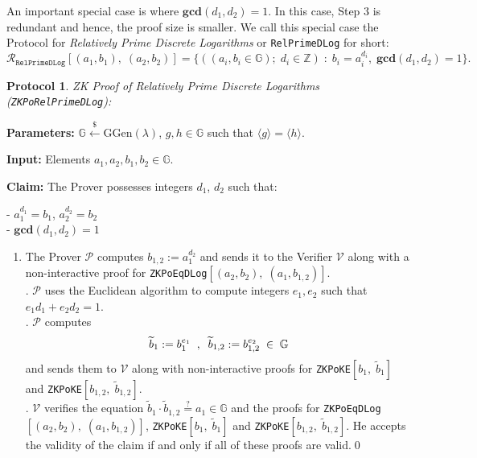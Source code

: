 \documentclass[11pt, lettersize, notitlepage, leqno, footskip=0.6cm]{article}
\newcommand{\bz}{\mathbb Z}
\newcommand{\ttt}{\texttt}
\newcommand{\bG}{\mathbb{G}}
\newcommand{\la}{\langle}
\newcommand{\ra}{\rangle}
\newcommand{\wti}{\widetilde}
\newcommand{\mc}{\mathcal}
\newcommand{\mb}{\mathbb}
\newcommand{\mbf}{\mathbf}
\newcommand{\mr}{\mathrm}
\newcommand{\lamb}{\lambda}
\newcommand{\V}{\mc{V}}
\newcommand{\vs}{\vspace{-0.15cm}}
\newcommand{\noin}{\noindent}
\newcommand{\GCD}{\mbf{gcd}}
\newtheorem{Prot}[Thm]{Protocol}
\numberwithin{equation}{section}
\begin{document}
\noin An important special case is where $\GCD(d_1, d_2) = 1$. In this case, Step 3 is redundant and hence, the proof size is smaller. We call this special case the Protocol for \textit{Relatively Prime Discrete Logarithms} or \verb|RelPrimeDLog| for short:\vs \[\mc{R}_{{\ttt{RelPrimeDLog}}}[(a_1,b_1),\;(a_2,b_2)] = \big\{((a_i, b_i\in\mb{G});\;d_i\in\bz)\;:\; b_i = a_i^{d_i},\;\GCD(d_1,d_2)=1 \big\} .\] 



\begin{Prot} \normalfont \hypertarget{RP}{\textit{ZK Proof of Relatively Prime Discrete Logarithms}} (\verb|ZKPoRelPrimeDLog|):\end{Prot} \vspace{-0.3cm}

\noin \textbf{Parameters:} $\mb{G}\xleftarrow{\$} \mr{GGen}(\lamb)$,  $g,h\in \mb{G}$ such that $\la g \ra = \la h \ra$.

\noin \textbf{Input:} Elements $a_1, a_2, b_1, b_2 \in \mb{G}$. 

\noin \textbf{Claim:} The Prover possesses integers $d_1$, $d_2$ such that:

\noin - $a_1^{d_1} = b_1$, $a_2^{d_2} = b_2$\\
\noin - $\GCD(d_1, d_2) = 1$
 

\begin{enumerate}[wide, labelwidth=!, labelindent=0pt]\vs \item The Prover $\mc{P}$ computes $b_{1,2}:= a_1^{d_2}$ and sends it to the Verifier $\V$ along with a\\ non-interactive proof for \verb|ZKPoEqDLog|$[(a_2, b_2),\; (a_1, b_{1,2})]$.\\
\noin 2. $\mc{P}$ uses the Euclidean algorithm to compute integers $e_1, e_2$ such that $e_1d_1 + e_2d_2 = 1$.\\
\noin 3. $\mc{P}$ computes \vs $$\wti{b}_1:= b_1^{e_1}\;\;,\;\; \wti{b}_{1,2}:= b_{1,2}^{e_2}\;\in\;\bG \vs $$ and sends them to $\V$ along with non-interactive proofs for \verb|ZKPoKE|$[b_1,\; \wti{b}_1]$ and \verb|ZKPoKE|$[b_{1,2},\; \wti{b}_{1,2}]$.\\
\noin 4. $\mc{V}$ verifies the equation $\wti{b}_1\cdot\wti{b}_{1,2}\stackrel{?}{=} a_1\in\bG $ and the proofs for \verb|ZKPoEqDLog|$[(a_2, b_2),\; (a_1, b_{1,2})]$, \verb|ZKPoKE|$[b_1,\; \wti{b}_1]$ and \verb|ZKPoKE|$[b_{1,2},\; \wti{b}_{1,2}]$. He accepts the validity of the claim if and only if all of these proofs are valid.\qed \end{enumerate}
\end{document}
